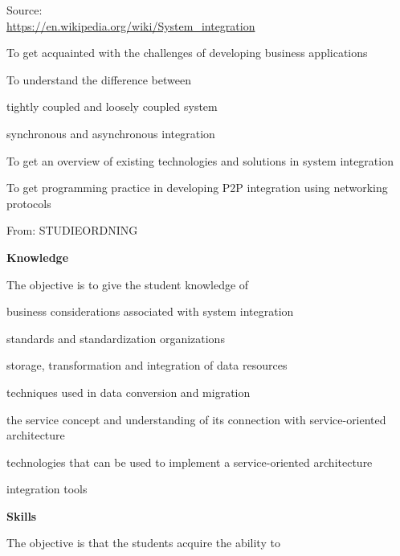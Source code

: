 \documentclass[Screen16to9,17pt]{foils}
\begin{document}
Source:\\
\url{https://en.wikipedia.org/wiki/System_integration}




\begin{list1}
\item To get acquainted with the challenges of developing business applications
\item To understand the difference between
\begin{list2}
\item tightly coupled and loosely coupled system
\item synchronous and asynchronous integration
\end{list2}
\item To get an overview of existing technologies and solutions in system integration
\item To get programming practice in developing P2P integration using networking
protocols
\end{list1}


From: STUDIEORDNING

{\bf Knowledge}

The objective is to give the student knowledge of

\begin{list2}
\item business considerations associated with system integration
\item standards and standardization organizations
\item storage, transformation and integration of data resources
\item techniques used in data conversion and migration
\item the service concept and understanding of its connection with service-oriented architecture
\item technologies that can be used to implement a service-oriented architecture
\item integration tools
\end{list2}


{\bf Skills}

The objective is that the students acquire the ability to
\end{document}
